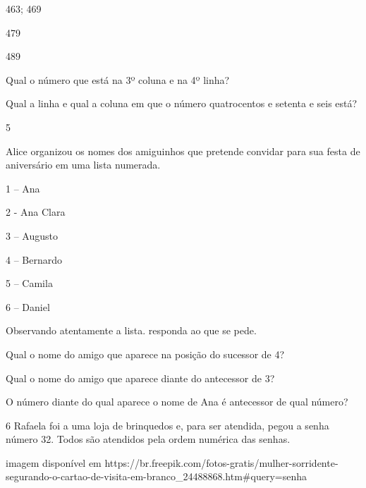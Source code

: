 \begin{escolha}
\begin{escolha}
{463; 469

479

489}

\item
  Qual o número que está na 3º coluna e na 4º linha?


\item
  Qual a linha e qual a coluna em que o número quatrocentos e setenta e seis está?

\end{escolha}

\num{5}

Alice organizou os nomes dos amiguinhos que pretende convidar para sua
festa de aniversário em uma lista numerada.


1 -- Ana

2 - Ana Clara

3 -- Augusto

4 -- Bernardo

5 -- Camila

6 -- Daniel

Observando atentamente a lista. responda ao que se pede.

\begin{escolha}

\item
  Qual o nome do amigo que aparece na posição do sucessor de 4?

\item
  Qual o nome do amigo que aparece diante do antecessor de 3?

\item
  O número diante do qual aparece o nome de Ana é antecessor de qual número?

\end{escolha}

\num{6} Rafaela foi a uma loja de brinquedos e, para ser atendida, pegou a senha
número 32. Todos são atendidos pela ordem numérica das senhas.

\incluir imagem disponível em https://br.freepik.com/fotos-gratis/mulher-sorridente-segurando-o-cartao-de-visita-em-branco_24488868.htm#query=senha%

\begin{escolha}


\end{escolha}
\end{escolha}
